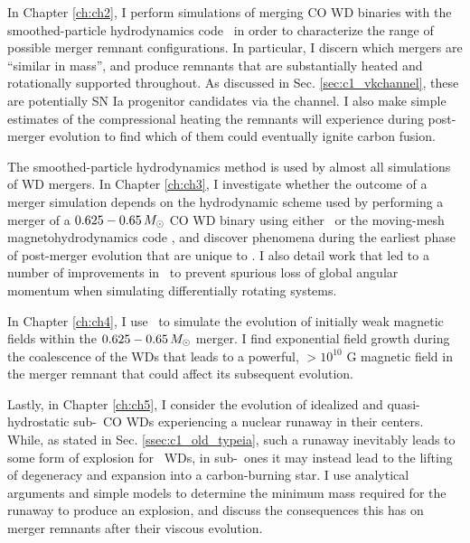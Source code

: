 
In Chapter \ref{ch:ch2}, I perform simulations of merging CO WD binaries with the smoothed-particle hydrodynamics code \gasoline\ in order to characterize the range of possible merger remnant configurations.  In particular, I discern which mergers are ``similar in mass'', and produce remnants that are substantially heated and rotationally supported throughout.  As discussed in Sec. \ref{sec:c1_vkchannel}, these are potentially SN Ia progenitor candidates via the \citeal{vkercj10} channel.  I also make simple estimates of the compressional heating the remnants will experience during post-merger evolution to find which of them could eventually ignite carbon fusion.

The smoothed-particle hydrodynamics method is used by almost all simulations of WD mergers.  In Chapter \ref{ch:ch3}, I investigate whether the outcome of a merger simulation depends on the hydrodynamic scheme used by performing a merger of a $0.625 - 0.65\,\Msun$ CO WD binary using either \gasoline\ or the moving-mesh magnetohydrodynamics code \arepo, and discover phenomena during the earliest phase of post-merger evolution that are unique to \arepo.  I also detail work that led to a number of improvements in \arepo\ to prevent spurious loss of global angular momentum when simulating differentially rotating systems.

In Chapter \ref{ch:ch4}, I use \arepo\ to simulate the evolution of initially weak magnetic fields within the $0.625 - 0.65\,\Msun$ merger.  I find exponential field growth during the coalescence of the WDs that leads to a powerful, $>10^{10}$ G magnetic field in the merger remnant that could affect its subsequent evolution.

Lastly, in Chapter \ref{ch:ch5}, I consider the evolution of idealized and quasi-hydrostatic sub-\Mch\ CO WDs experiencing a nuclear runaway in their centers.  While, as stated in Sec. \ref{ssec:c1_old_typeia}, such a runaway inevitably leads to some form of explosion for \Mch\ WDs, in sub-\Mch\ ones it may instead lead to the lifting of degeneracy and expansion into a carbon-burning star.  I use analytical arguments and simple models to determine the minimum mass required for the runaway to produce an explosion, and discuss the consequences this has on merger remnants after their viscous evolution.

